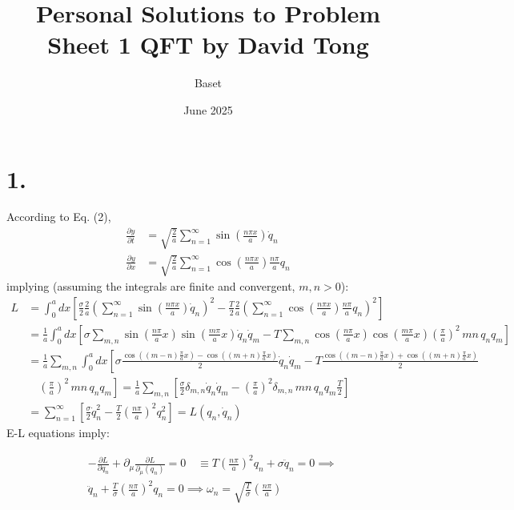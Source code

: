 \documentclass{article}
\title{Personal Solutions to Problem Sheet 1 QFT by David Tong}
\author{Baset}
\date{June 2025}
\begin{document}
\maketitle
\section*{1.}
According to Eq. (2),
\begin{equation}
    \begin{split}
        \frac{\partial y}{\partial t} &= \sqrt{\frac{2}{a}}\sum_{n=1}^\infty \sin(\frac{n\pi x}{a})\dot{q}_n\\
        \frac{\partial y}{\partial x} &= \sqrt{\frac{2}{a}}\sum_{n=1}^\infty \cos(\frac{n\pi x}{a})\frac{n\pi}{a}q_n
    \end{split}
\end{equation}
implying (assuming the integrals are finite and convergent, $m,n > 0$):
\begin{equation}
    \begin{split}
        L &= \int_0^a dx \left[\frac{\sigma}{2}\frac{2}{a}\left(\sum_{n=1}^\infty \sin\left(\frac{n\pi x}{a}\right)\dot{q}_n\right)^2 - \frac{T}{2}\frac{2}{a}\left(\sum_{n=1}^\infty \cos\left(\frac{n\pi x}{a}\right)\frac{n\pi}{a}q_n\right)^2 \right]\\
          &=\frac{1}{a}\int_0^a dx\left[\sigma \sum_{m,n}\sin(\frac{n\pi}{a}x)\sin(\frac{m\pi}{a}x)\dot{q}_n\dot{q}_m-T\sum_{m,n}\cos(\frac{n\pi}{a}x)\cos(\frac{m\pi}{a}x)(\frac{\pi}{a})^2 \, mn\, q_nq_m  \right] \\
          &= \frac{1}{a}\sum_{m,n}\int_0^a dx \left[\sigma \frac{\cos((m-n)\frac{\pi}{a}x)-\cos((m+n)\frac{\pi}{a}x)}{2}\dot{q}_n\dot{q}_m - T \frac{\cos((m-n)\frac{\pi}{a}x)+\cos((m+n)\frac{\pi}{a}x)}{2}\right.\\
          &\left.\quad(\frac{\pi}{a})^2 \, mn\, q_nq_m \right] = \frac{1}{a}\sum_{m,n} \left[ \frac{\sigma}{2}\delta_{m,n}\dot{q}_n\dot{q}_m - (\frac{\pi}{a})^2 \delta_{m,n} \, mn\, q_nq_m \frac{T}{2} \right] \\
          &= \sum_{n=1}^\infty \left[ \frac{\sigma}{2}\dot{q}_n^2 - \frac{T}{2}(\frac{n\pi}{a})^2 q_n^2  \right] = L(q_n,\dot{q}_n)  
        \end{split}
\end{equation}
E-L equations imply:

\begin{equation}
    \begin{split}
       & -\frac{\partial L}{\partial q_n} + \partial_\mu \frac{\partial L}{\partial_\mu(q_n)} = 0 \quad \equiv T(\frac{n\pi}{a})^2q_n + \sigma \ddot{q}_n = 0 \implies \\
       & \ddot{q}_n + \frac{T}{\sigma}(\frac{n\pi}{a})^2 q_n = 0 \implies \omega_n = \sqrt{\frac{T}{\sigma}} (\frac{n\pi}{a})\\
    \end{split}
\end{equation}
\end{document}

